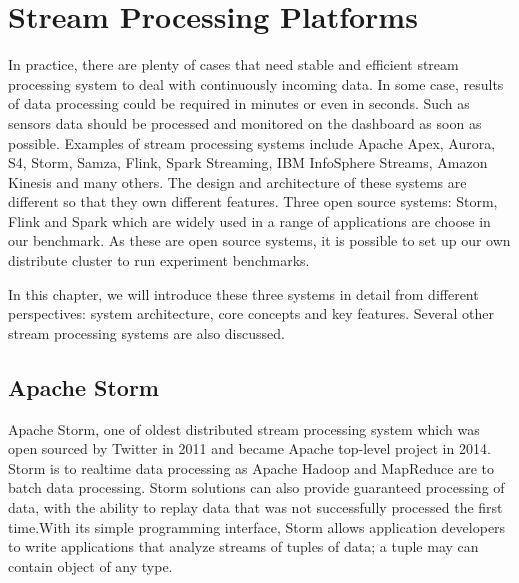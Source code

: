 \chapter{Stream Processing Platforms}
In practice, there are plenty of cases that need stable and efficient stream processing system to deal with continuously incoming data. In some case, results of data processing could be required in minutes or even in seconds. Such as sensors data should be processed and monitored on the dashboard as soon as possible. Examples of stream processing systems include Apache Apex, Aurora, S4, Storm, Samza, Flink, Spark Streaming, IBM InfoSphere Streams, Amazon Kinesis and many others. The design and architecture of these systems are different so that they own different features. Three open source systems: Storm, Flink and Spark which are widely used in a range of applications are choose in our benchmark. As these are open source systems, it is possible to set up our own distribute cluster to run experiment benchmarks. 

In this chapter, we will introduce these three systems in detail from different perspectives: system architecture, core concepts and key features. Several other stream processing systems are also discussed. 
 
\section{Apache Storm}
Apache Storm, one of oldest distributed stream processing system which was open sourced by Twitter in 2011 and became Apache top-level project in 2014.  Storm is to realtime data processing as Apache Hadoop and MapReduce are to batch data processing. Storm solutions can also provide guaranteed processing of data, with the ability to replay data that was not successfully processed the first time.With its simple programming interface, Storm allows application developers to write applications that analyze streams of tuples of data; a tuple may can contain object of any type.

